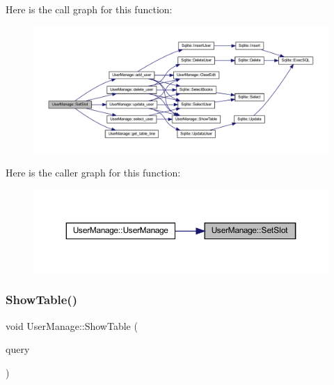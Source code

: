 Here is the call graph for this function\+:
\nopagebreak
\begin{figure}[H]
\begin{center}
\leavevmode
\includegraphics[width=350pt]{class_user_manage_aa838d49f063bc0a081a1eb4d967c2da3_cgraph}
\end{center}
\end{figure}
Here is the caller graph for this function\+:
\nopagebreak
\begin{figure}[H]
\begin{center}
\leavevmode
\includegraphics[width=350pt]{class_user_manage_aa838d49f063bc0a081a1eb4d967c2da3_icgraph}
\end{center}
\end{figure}
\mbox{\label{class_user_manage_aa0a2437c0e95fb846c0e5a237d848af2}} 
\subsubsection{\texorpdfstring{ShowTable()}{ShowTable()}}
{\footnotesize\ttfamily void User\+Manage\+::\+Show\+Table (\begin{DoxyParamCaption}\item[{Q\+Sql\+Query}]{query }\end{DoxyParamCaption})}

